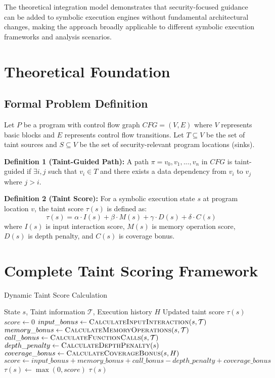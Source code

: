 The theoretical integration model demonstrates that security-focused guidance can be added to symbolic execution engines without fundamental architectural changes, making the approach broadly applicable to different symbolic execution frameworks and analysis scenarios.

\section{Theoretical Foundation}
\subsection{Formal Problem Definition}
Let $P$ be a program with control flow graph $CFG = (V, E)$ where $V$ represents basic blocks and $E$ represents control flow transitions. Let $T \subseteq V$ be the set of taint sources and $S \subseteq V$ be the set of security-relevant program locations (sinks).

\textbf{Definition 1 (Taint-Guided Path):} A path $\pi = v_0, v_1, ..., v_n$ in $CFG$ is taint-guided if $\exists i, j$ such that $v_i \in T$ and there exists a data dependency from $v_i$ to $v_j$ where $j > i$.

\textbf{Definition 2 (Taint Score):} For a symbolic execution state $s$ at program location $v$, the taint score $\tau(s)$ is defined as:
$$\tau(s) = \alpha \cdot I(s) + \beta \cdot M(s) + \gamma \cdot D(s) + \delta \cdot C(s)$$
where $I(s)$ is input interaction score, $M(s)$ is memory operation score, $D(s)$ is depth penalty, and $C(s)$ is coverage bonus.


\section{Complete Taint Scoring Framework}

\begin{algorithm}
\caption{Dynamic Taint Score Calculation}
\begin{algorithmic}[1]
\Require State $s$, Taint information $\mathcal{T}$, Execution history $H$
\Ensure Updated taint score $\tau(s)$
\State $score \gets 0$
\State $input\_bonus \gets \textsc{CalculateInputInteraction}(s, \mathcal{T})$
\State $memory\_bonus \gets \textsc{CalculateMemoryOperations}(s, \mathcal{T})$
\State $call\_bonus \gets \textsc{CalculateFunctionCalls}(s, \mathcal{T})$
\State $depth\_penalty \gets \textsc{CalculateDepthPenalty}(s)$
\State $coverage\_bonus \gets \textsc{CalculateCoverageBonus}(s, H)$
\State $score \gets input\_bonus + memory\_bonus + call\_bonus - depth\_penalty + coverage\_bonus$
\State $\tau(s) \gets \max(0, score)$ 
\State \Return $\tau(s)$
\end{algorithmic}
\end{algorithm}

